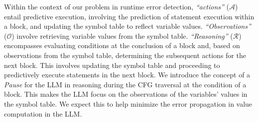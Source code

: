 Within the context of our problem in runtime error detection,
{\em ``actions''} ($\mathcal{A}$) entail predictive execution, involving the
prediction of statement execution within a block, and updating the
symbol table to reflect variable values. {\em ``Observations''}
($\mathcal{O}$) involve retrieving variable values from the symbol
table. {\em ``Reasoning'' } ($\mathcal{R}$) encompasses evaluating conditions
at the conclusion of a block and, based on observations from the
symbol table, determining the subsequent actions for the next
block. This involves updating the symbol table and proceeding to
predictively execute statements in the next block. We introduce the
concept of a {\em Pause} for the LLM in reasoning during the CFG
traversal at the condition of a block. This makes the LLM focus on the
observations of the variables' values in the symbol table. We expect
this to help minimize the error propagation in value computation in
the LLM.

%





